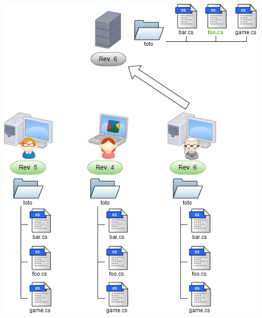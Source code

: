 \begin{frame}
  \begin{center}
    \includegraphics[scale=0.3]{images/6-Commit2.png}
  \end{center}
\end{frame}

